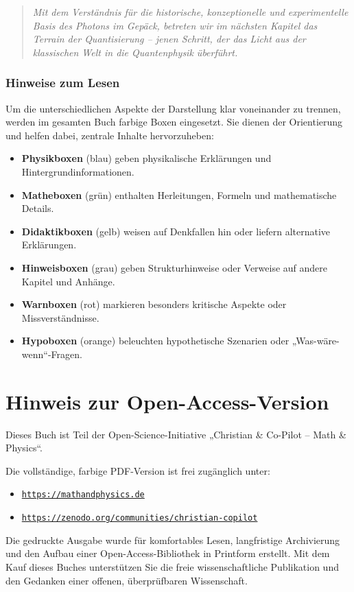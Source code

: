 \begin{quote}
	\textit{Mit dem Verständnis für die historische, konzeptionelle und experimentelle Basis des Photons im Gepäck, betreten wir im nächsten Kapitel das Terrain der Quantisierung – jenen Schritt, der das Licht aus der klassischen Welt in die Quantenphysik überführt.}
\end{quote}

\subsubsection*{Hinweise zum Lesen}
Um die unterschiedlichen Aspekte der Darstellung klar voneinander zu trennen,
werden im gesamten Buch farbige Boxen eingesetzt. Sie dienen der Orientierung
und helfen dabei, zentrale Inhalte hervorzuheben:

\begin{itemize}
	\item \textbf{Physikboxen} (blau) geben physikalische Erklärungen und
	Hintergrundinformationen.
	\item \textbf{Matheboxen} (grün) enthalten Herleitungen, Formeln und
	mathematische Details.
	\item \textbf{Didaktikboxen} (gelb) weisen auf Denkfallen hin oder liefern
	alternative Erklärungen.
	\item \textbf{Hinweisboxen} (grau) geben Strukturhinweise oder Verweise auf
	andere Kapitel und Anhänge.
	\item \textbf{Warnboxen} (rot) markieren besonders kritische Aspekte oder
	Missverständnisse.
	\item \textbf{Hypoboxen} (orange) beleuchten hypothetische Szenarien oder
	„Was-wäre-wenn“-Fragen.
\end{itemize}


\section*{Hinweis zur Open-Access-Version}

Dieses Buch ist Teil der Open-Science-Initiative „Christian \& Co-Pilot – Math \& Physics“.

Die vollständige, farbige PDF-Version ist frei zugänglich unter:

\begin{itemize}
	\item \href{https://mathandphysics.eu}{\texttt{https://mathandphysics.de}}
	\item \href{https://zenodo.org/communities/christian-copilot}{\texttt{https://zenodo.org/communities/christian-copilot}}
\end{itemize}
Die gedruckte Ausgabe wurde für komfortables Lesen, langfristige Archivierung
und den Aufbau einer Open-Access-Bibliothek in Printform erstellt.
Mit dem Kauf dieses Buches unterstützen Sie die freie wissenschaftliche Publikation
und den Gedanken einer offenen, überprüfbaren Wissenschaft.